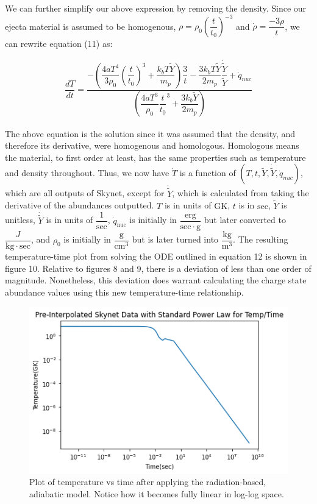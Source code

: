 \documentclass[11pt,a4paper]{article}
\begin{document}
We can further simplify our above expression by removing the density. Since our ejecta material is assumed to be homogenous,  $\rho = \rho_0 \left(\dfrac{t}{t_0}\right)^{-3}$ and $\dot{\rho} = \dfrac{-3 \rho}{t}$, we can rewrite equation (11) as:

\begin{align}
	\dfrac{dT}{dt} =  \dfrac{ -\left( \dfrac{4aT^4}{3 \rho_0} \left (\dfrac{t}{t_0} \right)^3 + \dfrac{k_b T \tilde{Y}}{m_p} \right) \dfrac{3}{t} - \dfrac{3 k_b T \tilde{Y}}{2 m_p} \dfrac{\dot{\tilde{Y}}}{\tilde{Y}} + \dot{q}_{nuc} } {  \left( \dfrac{4 a T^3}{\rho_0} \dfrac{t}{t_0}^3 + \dfrac{3 k_b \tilde{Y}}{2 m_p}\right) }
\end{align}

The above equation is the solution since it was assumed that the density, and therefore its derivative, were homogenous and homologous. Homologous means the material, to first order at least, has the same properties such as temperature and density throughout.  Thus, we now have $\dot{T}$ is a function of $(T,t,\tilde{Y}, \dot{\tilde{Y}},\dot{q}_{nuc})$, which are all outputs of Skynet, except for $\dot{\tilde{Y}}$, which is calculated from taking the derivative of the abundances outputted. $T$ is in units of $\mathrm{GK}$, $t$ is in $\mathrm{sec}$, $\tilde{Y}$ is unitless, $\dot{\tilde{Y}}$ is in units of $\dfrac{1}{\mathrm{sec}}$, $\dot{q}_{\mathrm{nuc}}$ is initially in $\dfrac{\mathrm{erg}}{\mathrm{sec \cdot g}}$ but later converted to $\dfrac{J}{\mathrm{kg \cdot sec}}$, and $\rho_0$ is initially in $\dfrac{\mathrm{g}}{{\mathrm{cm}}^3}$ but is later turned into $\dfrac{\mathrm{kg}}{\mathrm{m}^3}$. The resulting temperature-time plot from solving the ODE outlined in equation 12 is shown in figure 10. Relative to figures 8 and 9, there is a deviation of less than one order of magnitude. Nonetheless, this deviation does warrant calculating the charge state abundance values using this new temperature-time relationship. 

\begin{figure}[h!]
  \includegraphics[scale = .7]{linear_temp.png}
  \centering
  \caption{Plot of temperature vs time after applying the radiation-based, adiabatic model. Notice how it becomes fully linear in log-log space.}
\end{figure} 
\end{document}
